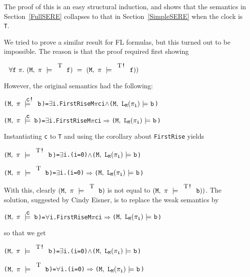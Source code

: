 \documentclass{llncs}
\newcommand{\And}{\(\wedge\)}
\newcommand{\Imp}{\(\Rightarrow\)}
\newcommand{\Forall}{\(\forall\)}
\newcommand{\Exists}{\(\exists\)}
\newcommand{\T}{\texttt{\small\rm{T}}}
\renewcommand{\Pi}{\(\pi\)}
\newcommand{\BSem}[3]{(\(\tt#1,~#2~{\models}~#3\))}
\newcommand{\sSem}[4]{(\tt{#1,~#2~\models^{\hspace*{-2.3mm}\raisebox{1mm}{\tt#3}}~#4})}
\newcommand{\FSem}[4]{(\(\tt{#1,~#2~\models^{\hspace*{-2.3mm}\raisebox{1mm}{\tt#3}}~#4}\))}
\newcommand{\fSem}[4]{(\tt{#1,~#2~\models^{\hspace*{-2.3mm}\raisebox{1mm}{\tt#3}}~#4})}
\newcommand{\FBool}[1]{#1}
\newcommand{\weakClock}[1]{#1}
\newcommand{\strongClock}[1]{#1!}
\newcommand{\pathEl}[2]{#1_{#2}}
\newcommand{\lNoHat}[1]{{\texttt{L}}_{#1}}
\renewcommand{\t}[1]{\texttt{#1}}
\begin{document}
The proof of this is an easy structural induction, and shows that the semantics in Section~\ref{FullSERE}
collapses to that in Section~\ref{SimpleSERE} when the clock is \T.

We tried to prove a similar result for FL formulas, but this turned out to be impossible.
The reason is that the proof required first showing


\medskip

$~~\forall{\t{f}}~\pi.~\fSem{M}{\pi}{\T}{f}~=~\sSem{M}{\pi}{\T\texttt{!}}{f})$

\medskip

However, the original semantics had the following:

{\begin{alltt}
  {\FSem{M}{{\pi}}{{\strongClock{c}}}{\FBool{b}}} = {\Exists}i. FirstRise M {\Pi} c i {\And} {\BSem{M}{\lNoHat{M}(\pathEl{{\pi}}{i})}{b}}

  {\FSem{M}{{\pi}}{{\weakClock{c}}}{{\FBool{b}}}}  = {\Exists}i. FirstRise M {\Pi} c i {\Imp} {\BSem{M}{\lNoHat{M}(\pathEl{{\pi}}{i})}{b}}
\end{alltt}}


Instantiating \t{c} to \T{} and using the corollary about \t{FirstRise} yields


{\begin{alltt}
  {\FSem{M}{{\pi}}{{\strongClock{\T}}}{\FBool{b}}} = {\Exists}i. (i=0) {\And} {\BSem{M}{\lNoHat{M}(\pathEl{{\pi}}{i})}{b}}

  {\FSem{M}{{\pi}}{{\weakClock{\T}}}{{\FBool{b}}}}  = {\Exists}i. (i=0) {\Imp} {\BSem{M}{\lNoHat{M}(\pathEl{{\pi}}{i})}{b}}
\end{alltt}}

With this, clearly $\fSem{M}{\pi}{\T}{\FBool{b}}$ is not equal to $\sSem{M}{\pi}{\T\texttt{!}}{\FBool{b}})$.
The solution, suggested by Cindy Eisner, is to replace the weak semantics by


{\begin{alltt}
  {\FSem{M}{{\pi}}{{\weakClock{c}}}{{\FBool{b}}}}  = {\Forall}i. FirstRise M {\Pi} c i {\Imp} {\BSem{M}{\lNoHat{M}(\pathEl{{\pi}}{i})}{b}}
\end{alltt}}

so that we get 


{\begin{alltt}
  {\FSem{M}{{\pi}}{{\strongClock{\T}}}{\FBool{b}}} = {\Exists}i. (i=0) {\And} {\BSem{M}{\lNoHat{M}(\pathEl{{\pi}}{i})}{b}}

  {\FSem{M}{{\pi}}{{\weakClock{\T}}}{{\FBool{b}}}}  = {\Forall}i. (i=0) {\Imp} {\BSem{M}{\lNoHat{M}(\pathEl{{\pi}}{i})}{b}}
\end{alltt}}
\end{document}
